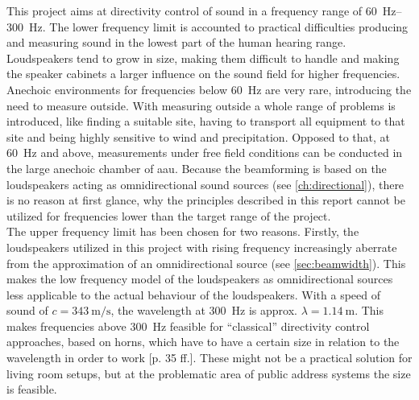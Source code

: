This project aims at directivity control of sound in a frequency range of \SIrange{60}{300}{\hertz}. The lower frequency limit is accounted to practical difficulties producing and measuring sound in the lowest part of the human hearing range. Loudspeakers tend to grow in size, making them difficult to handle and making the speaker cabinets a larger influence on the sound field for higher frequencies. Anechoic environments for frequencies below \SI{60}{\hertz} are very rare, introducing the need to measure outside. With measuring outside a whole range of problems is introduced, like finding a suitable site, having to transport all equipment to that site and being highly sensitive to wind and precipitation. Opposed to that, at \SI{60}{\hertz} and above, measurements under free field conditions can be conducted in the large anechoic chamber of \gls{aau}. Because the beamforming is based on the loudspeakers acting as omnidirectional sound sources (see \autoref{ch:directional}), there is no reason at first glance, why the principles described in this report cannot be utilized for frequencies lower than the target range of the project.\\
The upper frequency limit has been chosen for two reasons. Firstly, the loudspeakers utilized in this project with rising frequency increasingly aberrate from the approximation of an omnidirectional source (see \autoref{sec:beamwidth}). This makes the low frequency model of the loudspeakers as omnidirectional sources less applicable to the actual behaviour of the loudspeakers. With a speed of sound of $c=\SI{343}{\meter\per\second}$, the wavelength at \SI{300}{\hertz} is approx. $\lambda=\SI{1.14}{\meter}$. This makes frequencies above \SI{300}{\hertz} feasible for ``classical'' directivity control approaches, based on horns, which have to have a certain size in relation to the wavelength in order to work \citep{Borwick2012}[p. 35 ff.]. These might not be a practical solution for living room setups, but at the problematic area of public address systems the size is feasible.\\

